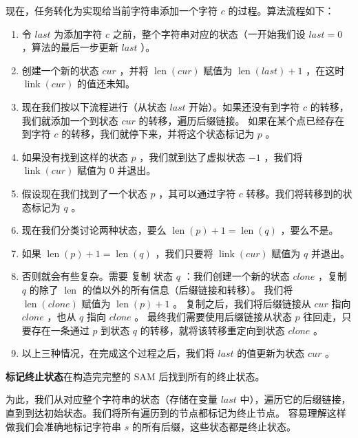 现在，任务转化为实现给当前字符串添加一个字符 $c$ 的过程。算法流程如下：
\begin{enumerate}
\item 令 $\textit{last}$ 为添加字符 $c$ 之前，整个字符串对应的状态（一开始我们设 $\textit{last}=0$ ，算法的最后一步更新 $\textit{last}$ ）。
\item 创建一个新的状态 $\textit{cur}$ ，并将 $\operatorname{len}(\textit{cur})$ 赋值为 $\operatorname{len}(\textit{last})+1$ ，在这时 $\operatorname{link}(\textit{cur})$ 的值还未知。
\item 现在我们按以下流程进行（从状态 $\textit{last}$ 开始）。如果还没有到字符 $c$ 的转移，我们就添加一个到状态 $\textit{cur}$ 的转移，遍历后缀链接。
如果在某个点已经存在到字符 $c$ 的转移，我们就停下来，并将这个状态标记为 $p$ 。
\item 如果没有找到这样的状态 $p$ ，我们就到达了虚拟状态 $-1$ ，我们将 $\operatorname{link}(\textit{cur})$ 赋值为 $0$ 并退出。
\item 假设现在我们找到了一个状态 $p$ ，其可以通过字符 $c$ 转移。我们将转移到的状态标记为 $q$ 。
\item 现在我们分类讨论两种状态，要么 $\operatorname{len}(p) + 1 = \operatorname{len}(q)$ ，要么不是。
\item 如果 $\operatorname{len}(p)+1=\operatorname{len}(q)$ ，我们只要将 $\operatorname{link}(\textit{cur})$ 赋值为 $q$ 并退出。
\item 否则就会有些复杂。需要 复制 状态 $q$ ：我们创建一个新的状态 $\textit{clone}$ ，复制 $q$ 的除了 $\operatorname{len}$ 的值以外的所有信息（后缀链接和转移）。
我们将 $\operatorname{len}(\textit{clone})$ 赋值为 $\operatorname{len}(p)+1$ 。  
复制之后，我们将后缀链接从 $\textit{cur}$ 指向 $\textit{clone}$ ，也从 $q$ 指向 $\textit{clone}$ 。  
最终我们需要使用后缀链接从状态 $p$ 往回走，只要存在一条通过 $p$ 到状态 $q$ 的转移，就将该转移重定向到状态 $\textit{clone}$ 。
\item 以上三种情况，在完成这个过程之后，我们将 $\textit{last}$ 的值更新为状态 $\textit{cur}$ 。
\end{enumerate}

\textbf{标记终止状态}在构造完完整的 SAM 后找到所有的终止状态。\par
为此，我们从对应整个字符串的状态（存储在变量 $\textit{last}$ 中），遍历它的后缀链接，直到到达初始状态。我们将所有遍历到的节点都标记为终止节点。
容易理解这样做我们会准确地标记字符串 $s$ 的所有后缀，这些状态都是终止状态。

